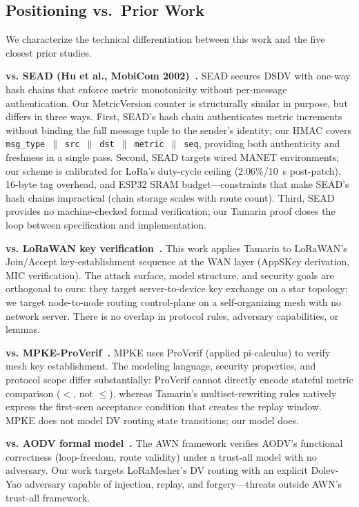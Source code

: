 \documentclass[10pt,journal,compsoc]{IEEEtran}
\begin{document}
\subsection{Positioning vs.\ Prior Work}
\label{sec:positioning}

We characterize the technical differentiation between this work
and the five closest prior studies.

\textbf{vs. SEAD (Hu et al., MobiCom 2002)~\cite{hu2002-sead}.}
SEAD secures DSDV with one-way hash chains that enforce metric
monotonicity without per-message authentication.
Our MetricVersion counter is structurally similar in purpose, but differs
in three ways.
First, SEAD's hash chain authenticates metric increments without binding
the full message tuple to the sender's identity; our HMAC covers
\texttt{msg\_type}~$\|$~\texttt{src}~$\|$~\texttt{dst}~$\|$~\texttt{metric}~$\|$~\texttt{seq},
providing both authenticity and freshness in a single pass.
Second, SEAD targets wired MANET environments; our scheme is calibrated
for LoRa's duty-cycle ceiling (2.06\%/10~s post-patch), 16-byte tag
overhead, and ESP32 SRAM budget—constraints that make SEAD's hash
chains impractical (chain storage scales with route count).
Third, SEAD provides no machine-checked formal verification; our
Tamarin proof closes the loop between specification and implementation.

\textbf{vs. LoRaWAN key verification~\cite{ieee2025-lorawan-key-verification}.}
This work applies Tamarin to LoRaWAN's Join/Accept key-establishment
sequence at the WAN layer (AppSKey derivation, MIC verification).
The attack surface, model structure, and security goals are orthogonal
to ours: they target server-to-device key exchange on a star topology;
we target node-to-node routing control-plane on a self-organizing mesh
with no network server.
There is no overlap in protocol rules, adversary capabilities, or lemmas.

\textbf{vs. MPKE-ProVerif~\cite{ieee2025-mpke-proverif}.}
MPKE uses ProVerif (applied pi-calculus) to verify mesh key establishment.
The modeling language, security properties, and protocol scope differ substantially:
ProVerif cannot directly encode stateful metric comparison (\texttt{$<$},
not \texttt{$\leq$}), whereas Tamarin's multiset-rewriting rules
natively express the first-seen acceptance condition that creates the
replay window.
MPKE does not model DV routing state transitions; our model does.

\textbf{vs. AODV formal model~\cite{glabbeek2016-aodv-verification}.}
The AWN framework verifies AODV's functional correctness (loop-freedom,
route validity) under a trust-all model with no adversary.
Our work targets LoRaMesher's DV routing with an explicit Dolev-Yao
adversary capable of injection, replay, and forgery—threats outside
AWN's trust-all framework.
\end{document}
